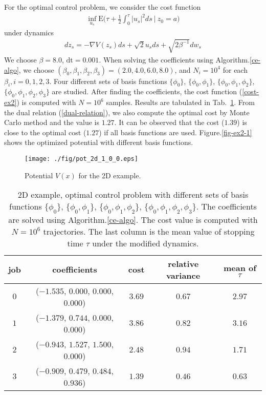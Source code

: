 \documentclass[final]{siamltex}
\begin{document}
For the optimal control problem, we consider the cost function 
\begin{align}
  \inf_{u_s} \mathrm{E}\Big(\tau + \frac{1}{2}\int_0^\tau |u_s|^2 ds ~\Big|~ z_0 = a \Big)
  \label{cost-ex2}
\end{align}
under dynamics
\begin{align}
  dz_s = - \nabla V(z_s) ds + \sqrt{2}u_s ds + \sqrt{2\beta^{-1}} dw_s
\end{align}
We choose $\beta = 8.0$, $\mbox{dt} = 0.001$. When solving the coefficients
using Algorithm.\ref{ce-algo}, we
choose $(\beta_0, \beta_1 , \beta_2, \beta_3) = (2.0, 4.0, 6.0, 8.0)$, and
$N_i = 10^4$ for each $\beta_i, i = 0, 1, 2, 3$. Four different sets of
basis functions $\{\phi_0\}$, $\{\phi_0, \phi_1\}$, $\{\phi_0, \phi_1,
\phi_2\}$, $\{\phi_0, \phi_1, \phi_2, \phi_3\}$ are studied. After finding the coefficients, the cost function (\ref{cost-ex2}) is computed with $N =
10^6$ samples. Results are tabulated in Tab.~\ref{tab-ex2-1}. From the dual relation
(\ref{dual-relation}), we also compute the optimal cost by Monte Carlo method
and the value is $1.27$. It can be observed that the cost ($1.39$) is close to the
optimal cost ($1.27$) if all basis functions are used. Figure.\ref{fig-ex2-1} shows the optimized potential with different basis functions.
\begin{figure}[tphb]
  \centering
    \texttt{[image: ./fig/pot\_2d\_1\_0\_0.eps]}
    \caption{Potential $V(x)$ for the 2D example. \label{fig-ex2-0}}
\end{figure}
\begin{table}[tphb]
  \begin{tabular*}{0.9\textwidth}{@{\extracolsep{\fill}}ccccc}
    \hline
    \hline
    job & coefficients & cost & relative variance & mean of $\tau$ \\
    \hline
    $0$ & ($-1.535$, $0.000$, $0.000$, $0.000$) & $3.69$ & $0.67$ & $2.97$ \\
    $1$ & ($-1.379$, $0.744$, $0.000$, $0.000$) & $3.86$ & $0.82$ & $3.16$ \\
    $2$ & ($-0.943$, $1.527$, $1.500$, $0.000$) & $2.48$ & $0.94$ & $1.71$ \\
    $3$ & ($-0.909$, $0.479$, $0.484$, $0.936$) & $1.39$ & $0.46$ & $0.63$ \\
    \hline
    \hline
  \end{tabular*}
  \centering
  \caption{2D example, optimal control problem with different sets of basis
  functions $\{\phi_0\}$, $\{\phi_0, \phi_1\}$, $\{\phi_0, \phi_1, \phi_2\}$, $\{\phi_0, \phi_1, \phi_2, \phi_3\}$.
  The coefficients are solved using Algorithm.\ref{ce-algo}. The cost value is
  computed with $N=10^{6}$ trajectories.
The last column is the mean value of stopping time $\tau$ under the modified
dynamics. \label{tab-ex2-1}}
\end{table}
\end{document}
